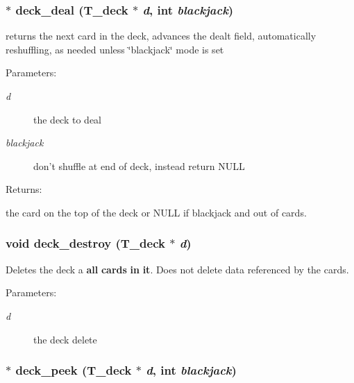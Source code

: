 \subsubsection{$\ast$ deck\_\-deal ({\bf T\_\-deck} $\ast$ {\em d}, int {\em blackjack})}\label{deck_8h_a3}


returns the next card in the deck, advances the dealt field, automatically reshuffling, as needed unless \char`\"{}blackjack\char`\"{} mode is set

\begin{Desc}
\item[Parameters: ]\par
\begin{description}
\item[{\em 
d}]the deck to deal \item[{\em 
blackjack}]don't shuffle at end of deck, instead return NULL \end{description}
\end{Desc}
\begin{Desc}
\item[Returns: ]\par
the card on the top of the deck or NULL if blackjack and out of cards. \end{Desc}
\subsubsection{\setlength{\rightskip}{0pt plus 5cm}void deck\_\-destroy ({\bf T\_\-deck} $\ast$ {\em d})}\label{deck_8h_a1}


Deletes the deck a {\bf all} {\bf cards} {\bf in} {\bf it}. Does not delete data referenced by the cards.

\begin{Desc}
\item[Parameters: ]\par
\begin{description}
\item[{\em 
d}]the deck delete \end{description}
\end{Desc}
\subsubsection{$\ast$ deck\_\-peek ({\bf T\_\-deck} $\ast$ {\em d}, int {\em blackjack})}\label{deck_8h_a4}


